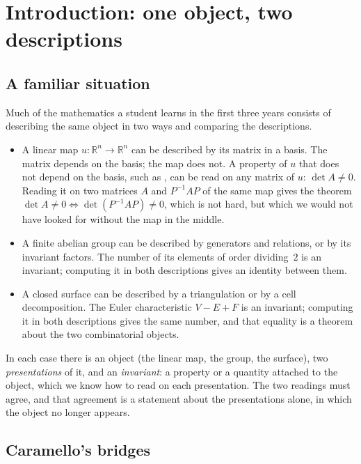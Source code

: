 \section{Introduction: one object, two descriptions}\label{sec:intro}

\subsection{A familiar situation}

Much of the mathematics a student learns in the first three years consists of describing the same object in two ways and comparing the descriptions.

\begin{itemize}
\item A linear map $u : \mathbb R^n\to\mathbb R^n$ can be described by its matrix in a basis. The matrix depends on the basis; the map does not. A property of $u$ that does not depend on the basis, such as , can be read on any matrix of $u$: $\det A\neq 0$. Reading it on two matrices $A$ and $P^{-1}AP$ of the same map gives the theorem $\det A\neq 0\iff\det(P^{-1}AP)\neq 0$, which is not hard, but which we would not have looked for without the map in the middle.
\item A finite abelian group can be described by generators and relations, or by its invariant factors. The number of its elements of order dividing~$2$ is an invariant; computing it in both descriptions gives an identity between them.
\item A closed surface can be described by a triangulation or by a cell decomposition. The Euler characteristic $V-E+F$ is an invariant; computing it in both descriptions gives the same number, and that equality is a theorem about the two combinatorial objects.
\end{itemize}

In each case there is an object (the linear map, the group, the surface), two \emph{presentations} of it, and an \emph{invariant}: a property or a quantity attached to the object, which we know how to read on each presentation. The two readings must agree, and that agreement is a statement about the presentations alone, in which the object no longer appears.

\subsection{Caramello's bridges}

